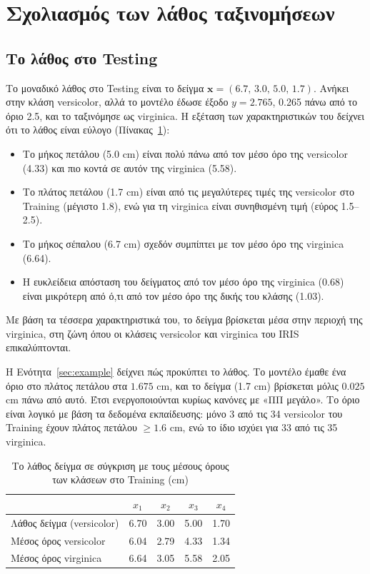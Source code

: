 \documentclass[conference]{IEEEtran}
\begin{document}
\section{Σχολιασμός των λάθος ταξινομήσεων}

\subsection{Το λάθος στο Testing}
Το μοναδικό λάθος στο Testing είναι το δείγμα $\mathbf{x}=(6.7,\,3.0,\,5.0,\,1.7)$.
Ανήκει στην κλάση versicolor, αλλά το μοντέλο έδωσε έξοδο $y=2.765$,
0.265 πάνω από το όριο 2.5, και το ταξινόμησε ως virginica. Η εξέταση των
χαρακτηριστικών του δείχνει ότι το λάθος είναι εύλογο (Πίνακας~\ref{tab:err}):
\begin{itemize}
\item Το μήκος πετάλου (5.0 cm) είναι πολύ πάνω από τον μέσο όρο της versicolor
(4.33) και πιο κοντά σε αυτόν της virginica (5.58).
\item Το πλάτος πετάλου (1.7 cm) είναι από τις μεγαλύτερες τιμές της versicolor
στο Training (μέγιστο 1.8), ενώ για τη virginica είναι συνηθισμένη τιμή
(εύρος 1.5--2.5).
\item Το μήκος σέπαλου (6.7 cm) σχεδόν συμπίπτει με τον μέσο όρο της virginica (6.64).
\item Η ευκλείδεια απόσταση του δείγματος από τον μέσο όρο της virginica (0.68)
είναι μικρότερη από ό,τι από τον μέσο όρο της δικής του κλάσης (1.03).
\end{itemize}
Με βάση τα τέσσερα χαρακτηριστικά του, το δείγμα βρίσκεται μέσα στην περιοχή
της virginica, στη ζώνη όπου οι κλάσεις versicolor και virginica του IRIS
επικαλύπτονται.

Η Ενότητα~\ref{sec:example} δείχνει πώς προκύπτει το λάθος. Το μοντέλο
έμαθε ένα όριο στο πλάτος πετάλου στα $1.675$ cm, και το δείγμα (1.7 cm)
βρίσκεται μόλις $0.025$ cm πάνω από αυτό. Έτσι ενεργοποιούνται κυρίως κανόνες
με «ΠΠ μεγάλο». Το όριο είναι λογικό με βάση τα δεδομένα εκπαίδευσης: μόνο 3 από τις
34 versicolor του Training έχουν πλάτος πετάλου $\ge1.6$ cm, ενώ το ίδιο ισχύει για
33 από τις 35 virginica.

\begin{table}[!t]
\centering
\caption{Το λάθος δείγμα σε σύγκριση με τους μέσους όρους των κλάσεων στο Training (cm)}
\label{tab:err}
\setlength{\tabcolsep}{4pt}
\begin{tabular}{lcccc}
\toprule
 & $x_1$ & $x_2$ & $x_3$ & $x_4$ \\
\midrule
Λάθος δείγμα (versicolor) & 6.70 & 3.00 & 5.00 & 1.70 \\
Μέσος όρος versicolor     & 6.04 & 2.79 & 4.33 & 1.34 \\
Μέσος όρος virginica      & 6.64 & 3.05 & 5.58 & 2.05 \\
\bottomrule
\end{tabular}
\end{table}
\end{document}
